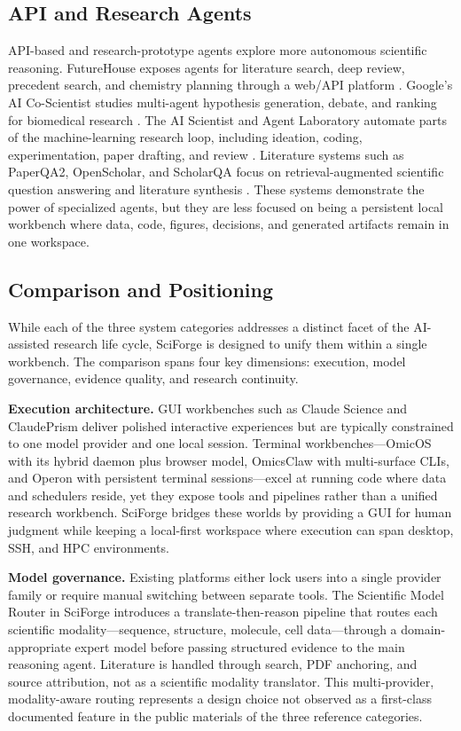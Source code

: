 \documentclass[sn-basic,Numbered,pdflatex]{sn-jnl}
\begin{document}
\subsection{API and Research Agents}

API-based and research-prototype agents explore more autonomous scientific reasoning. FutureHouse exposes agents for literature search, deep review, precedent search, and chemistry planning through a web/API platform \cite{futureHousePlatform2025}. Google's AI Co-Scientist studies multi-agent hypothesis generation, debate, and ranking for biomedical research \cite{googleCoScientist2025}. The AI Scientist and Agent Laboratory automate parts of the machine-learning research loop, including ideation, coding, experimentation, paper drafting, and review \cite{sakanaAIScientist2024,agentLaboratory2025}. Literature systems such as PaperQA2, OpenScholar, and ScholarQA focus on retrieval-augmented scientific question answering and literature synthesis \cite{paperQA2024,openScholar2024,scholarQA2025}. These systems demonstrate the power of specialized agents, but they are less focused on being a persistent local workbench where data, code, figures, decisions, and generated artifacts remain in one workspace.

\subsection{Comparison and Positioning}

While each of the three system categories addresses a distinct facet of the AI-assisted research life cycle, SciForge is designed to unify them within a single workbench. The comparison spans four key dimensions: execution, model governance, evidence quality, and research continuity.

\textbf{Execution architecture.} GUI workbenches such as Claude Science and ClaudePrism deliver polished interactive experiences but are typically constrained to one model provider and one local session. Terminal workbenches---OmicOS with its hybrid daemon plus browser model, OmicsClaw with multi-surface CLIs, and Operon with persistent terminal sessions---excel at running code where data and schedulers reside, yet they expose tools and pipelines rather than a unified research workbench. SciForge bridges these worlds by providing a GUI for human judgment while keeping a local-first workspace where execution can span desktop, SSH, and HPC environments.

\textbf{Model governance.} Existing platforms either lock users into a single provider family or require manual switching between separate tools. The Scientific Model Router in SciForge introduces a translate-then-reason pipeline that routes each scientific modality---sequence, structure, molecule, cell data---through a domain-appropriate expert model before passing structured evidence to the main reasoning agent. Literature is handled through search, PDF anchoring, and source attribution, not as a scientific modality translator. This multi-provider, modality-aware routing represents a design choice not observed as a first-class documented feature in the public materials of the three reference categories.
\end{document}
